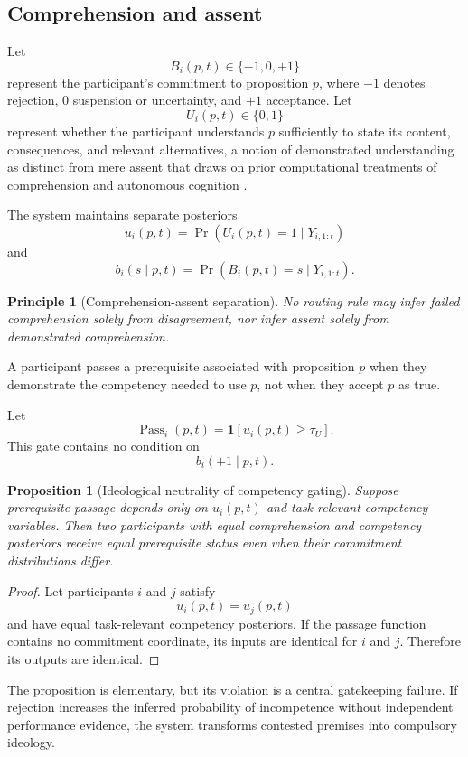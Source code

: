 \documentclass[11pt]{article}
\newtheorem{proposition}[definition]{Proposition}
\newtheorem{principle}[definition]{Principle}
\theoremstyle{definition}
\DeclareMathOperator{\Prob}{Pr}
\newcommand{\ind}{\mathbf{1}}
\begin{document}
\subsection{Comprehension and assent}

Let
\[
B_i(p,t)\in\{-1,0,+1\}
\]
represent the participant's commitment to proposition \(p\), where \(-1\) denotes rejection, \(0\) suspension or uncertainty, and \(+1\) acceptance. Let
\[
U_i(p,t)\in\{0,1\}
\]
represent whether the participant understands \(p\) sufficiently to state its content, consequences, and relevant alternatives, a notion of demonstrated understanding as distinct from mere assent that draws on prior computational treatments of comprehension and autonomous cognition \cite{degyurky2014,anderson2022um1}.

The system maintains separate posteriors
\[
u_i(p,t)
=
\Prob(U_i(p,t)=1\mid Y_{i,1:t})
\]
and
\[
b_i(s\mid p,t)
=
\Prob(B_i(p,t)=s\mid Y_{i,1:t}).
\]

\begin{principle}[Comprehension-assent separation]
No routing rule may infer failed comprehension solely from disagreement, nor infer assent solely from demonstrated comprehension.
\end{principle}

A participant passes a prerequisite associated with proposition \(p\) when they demonstrate the competency needed to use \(p\), not when they accept \(p\) as true.

Let
\[
\operatorname{Pass}_i(p,t)
=
\ind[u_i(p,t)\geq\tau_U].
\]
This gate contains no condition on
\[
b_i(+1\mid p,t).
\]

\begin{proposition}[Ideological neutrality of competency gating]
Suppose prerequisite passage depends only on \(u_i(p,t)\) and task-relevant competency variables. Then two participants with equal comprehension and competency posteriors receive equal prerequisite status even when their commitment distributions differ.
\end{proposition}

\begin{proof}
Let participants \(i\) and \(j\) satisfy
\[
u_i(p,t)=u_j(p,t)
\]
and have equal task-relevant competency posteriors. If the passage function contains no commitment coordinate, its inputs are identical for \(i\) and \(j\). Therefore its outputs are identical.
\end{proof}

The proposition is elementary, but its violation is a central gatekeeping failure. If rejection increases the inferred probability of incompetence without independent performance evidence, the system transforms contested premises into compulsory ideology.
\end{document}
